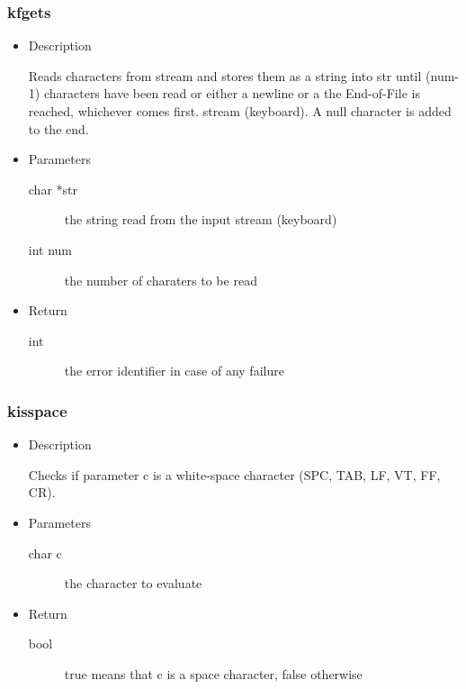 \subsubsection{kfgets}
\begin{itemize}
\item{Description}

	Reads characters from stream and stores them as a string into str until (num-1)
	characters have been read or either a newline or a the End-of-File is reached,
	whichever comes first. stream (keyboard). A null character is added to the end.
\item{Parameters}
	\begin{description}
	\item[char *str]  the string read from the input stream (keyboard)
	\item[int num]  the number of charaters to be read
	\end{description}
\item{Return}
	\begin{description}
	\item[int] the error identifier in case of any failure
	\end{description}
\end{itemize}

\subsubsection{kisspace}
\begin{itemize}
\item{Description}

	Checks if parameter c is a white-space character (SPC, TAB, LF, VT, FF, CR).
\item{Parameters}
	\begin{description}
	\item[char c] the character to evaluate
	\end{description}
\item{Return}
	\begin{description}
	\item[bool] true means that c is a space character, false otherwise
	\end{description}
\end{itemize}

